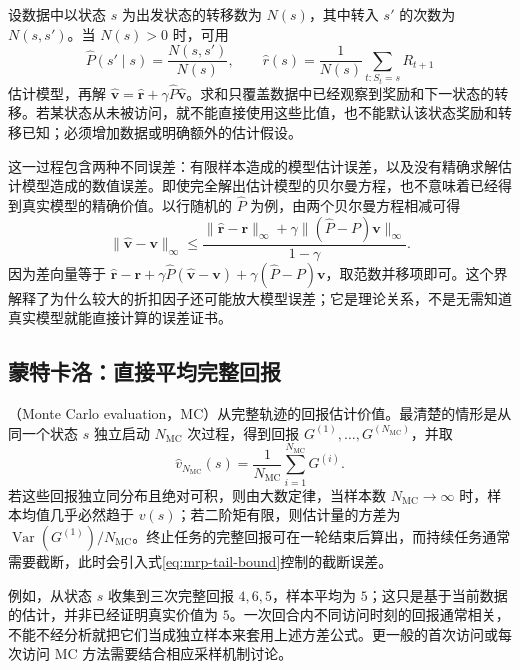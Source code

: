 \documentclass[UTF8]{ctexart}
\begin{document}
设数据中以状态 $s$ 为出发状态的转移数为 $N(s)$，其中转入 $s'$ 的次数为 $N(s,s')$。当 $N(s)>0$ 时，可用
\begin{equation}
  \widehat P(s'\mid s)=\frac{N(s,s')}{N(s)},\qquad
  \widehat r(s)=\frac{1}{N(s)}\sum_{t:S_t=s}R_{t+1}
  \label{eq:mrp-model-estimates}
\end{equation}
估计模型，再解 $\widehat{\boldsymbol v}=\widehat{\boldsymbol r}+\gamma\widehat P\widehat{\boldsymbol v}$。求和只覆盖数据中已经观察到奖励和下一状态的转移。若某状态从未被访问，就不能直接使用这些比值，也不能默认该状态奖励和转移已知；必须增加数据或明确额外的估计假设。

这一过程包含两种不同误差：有限样本造成的模型估计误差，以及没有精确求解估计模型造成的数值误差。即使完全解出估计模型的贝尔曼方程，也不意味着已经得到真实模型的精确价值。以行随机的 $\widehat P$ 为例，由两个贝尔曼方程相减可得
\begin{equation}
  \|\widehat{\boldsymbol v}-\boldsymbol v\|_\infty
  \leq\frac{\|\widehat{\boldsymbol r}-\boldsymbol r\|_\infty
  +\gamma\|(\widehat P-P)\boldsymbol v\|_\infty}{1-\gamma}.
  \label{eq:mrp-model-error}
\end{equation}
因为差向量等于 $\widehat{\boldsymbol r}-\boldsymbol r+\gamma\widehat P(\widehat{\boldsymbol v}-\boldsymbol v)+\gamma(\widehat P-P)\boldsymbol v$，取范数并移项即可。这个界解释了为什么较大的折扣因子还可能放大模型误差；它是理论关系，不是无需知道真实模型就能直接计算的误差证书。

\subsection{蒙特卡洛：直接平均完整回报}

（Monte Carlo evaluation，MC）从完整轨迹的回报估计价值。最清楚的情形是从同一个状态 $s$ 独立启动 $N_{\mathrm{MC}}$ 次过程，得到回报 $G^{(1)},\ldots,G^{(N_{\mathrm{MC}})}$，并取
\begin{equation}
  \widehat v_{N_{\mathrm{MC}}}(s)
  =\frac{1}{N_{\mathrm{MC}}}\sum_{i=1}^{N_{\mathrm{MC}}}G^{(i)}.
  \label{eq:mrp-mc}
\end{equation}
若这些回报独立同分布且绝对可积，则由大数定律，当样本数 $N_{\mathrm{MC}}\to\infty$ 时，样本均值几乎必然趋于 $v(s)$；若二阶矩有限，则估计量的方差为 $\operatorname{Var}(G^{(1)})/N_{\mathrm{MC}}$。终止任务的完整回报可在一轮结束后算出，而持续任务通常需要截断，此时会引入式\eqref{eq:mrp-tail-bound}控制的截断误差。

例如，从状态 $s$ 收集到三次完整回报 $4,6,5$，样本平均为 $5$；这只是基于当前数据的估计，并非已经证明真实价值为 $5$。一次回合内不同访问时刻的回报通常相关，不能不经分析就把它们当成独立样本来套用上述方差公式。更一般的首次访问或每次访问 MC 方法需要结合相应采样机制讨论。
\end{document}
